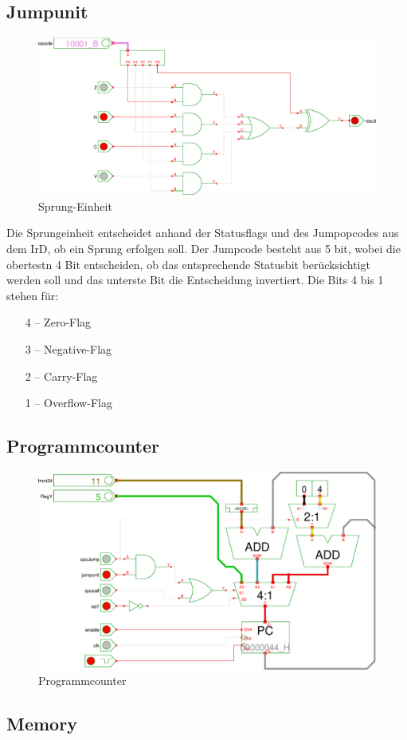 \subsection{Jumpunit}
\begin{figure}[!h]
\centering
\includegraphics[width=1\textwidth]{images/ju.eps}
\caption{\label{HW:JU}Sprung-Einheit}
\end{figure}
Die Sprungeinheit entscheidet anhand der Statusflags und des Jumpopcodes aus dem IrD, ob ein Sprung erfolgen soll. Der Jumpcode besteht aus 5 bit, wobei die obertestn 4 Bit entscheiden, ob das entsprechende Statusbit berücksichtigt werden soll und das unterste Bit die Entscheidung invertiert. Die Bits 4 bis 1 stehen für:
\begin{enumerate}
 \item[4] -- Zero-Flag
 \item[3] -- Negative-Flag
 \item[2] -- Carry-Flag
 \item[1] -- Overflow-Flag
\end{enumerate}
\subsection{Programmcounter}
\begin{figure}[h]
\centering
\includegraphics[width=1\textwidth]{images/pc.eps}
\caption{\label{HW:PC}Programmcounter}
\end{figure}
\subsection{Memory}
